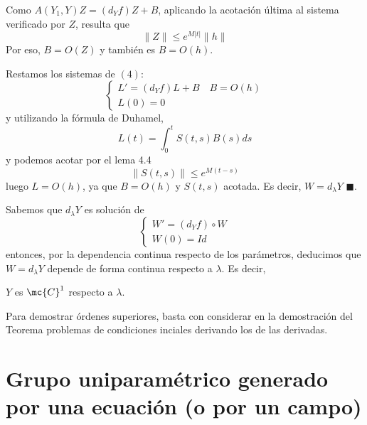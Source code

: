 \begin{dem}
Como $A(Y_1,Y)Z=(d_Yf)Z+B$, aplicando la acotación última al sistema verificado por $Z$, resulta que 
$$\|Z\|\leq e^{M|t|}\|h\|$$
Por eso, $B=O(Z)$ y también es $B=O(h)$.

Restamos los sistemas de $(4)$:
$$\left\{ \begin{array}{l}
     L'=(d_Yf)L + B \quad B=O(h)  \\
    L(0)=0
\end{array} 
\right.$$
y utilizando la fórmula de Duhamel,
$$L(t)=\int_0^t S(t,s) B(s) ds $$
y podemos acotar por el lema 4.4
$$\|S(t,s)\|\leq e^{M(t-s)}$$
luego $L=O(h)$, ya que $B=O(h)$ y $S(t,s)$ acotada. Es decir, $W=d_{\lambda}Y$ \hfill $\blacksquare.$
\end{dem}
\begin{cor}
    Sabemos que $d_{\lambda}Y$ es solución de 
    $$\left\{ \begin{array}{l}
     W'=(d_Yf) \circ W  \\
     W(0)=Id
\end{array} 
\right.$$
entonces, por la dependencia continua respecto de los parámetros, deducimos que $W=d_{\lambda}Y$ depende de forma continua respecto a $\lambda$. Es decir, 
\begin{center}
    $Y$ es $\mc{C}^1$ respecto a $\lambda$.
\end{center}
Para demostrar órdenes superiores, basta con considerar en la demostración del Teorema problemas de condiciones inciales derivando los de las derivadas.
\end{cor}





\chapter{Grupo uniparamétrico generado por una ecuación \; (o por un campo)}
